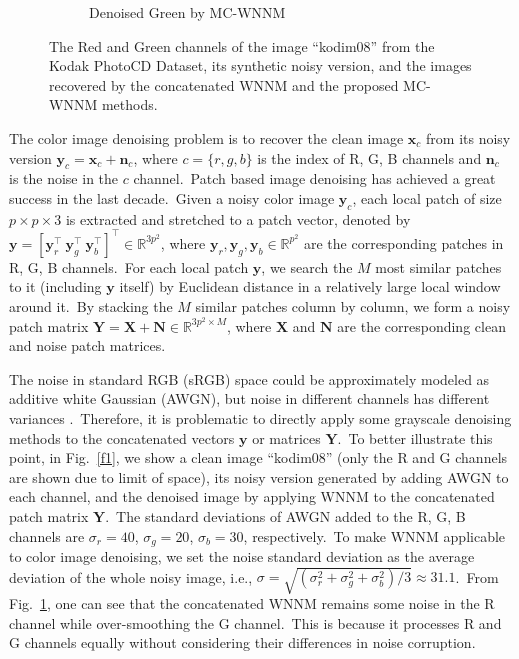 \begin{figure}
\begin{subfigure}[t]{0.24\textwidth}
\caption{Denoised Green by MC-WNNM}
    \end{subfigure}
    \caption{The Red and Green channels of the image ``kodim08'' from the Kodak PhotoCD Dataset, its synthetic noisy version, and the images recovered by the concatenated WNNM and the proposed MC-WNNM methods.}
    \label{fig4-1}
\end{figure}

The color image denoising problem is to recover the clean image $\mathbf{x}_{c}$ from its noisy version $\mathbf{y}_{c}=\mathbf{x}_{c}+\mathbf{n}_{c}$, where $c=\{r, g, b\}$ is the index of R, G, B channels and $\mathbf{n}_{c}$ is the noise in the $c$ channel.\ Patch based image denoising \cite{foe,ksvd,bm3d,lssc,epll,ncsr,mlp,csf,wnnm,pgpd,chen2015learning,dncnn} has achieved a great success in the last decade.\ Given a noisy color image $\mathbf{y}_{c}$, each local patch of size $p\times p \times 3$ is extracted and stretched to a patch vector, denoted by $\mathbf{y}=[\mathbf{y}_{r}^{\top}\ \mathbf{y}_{g}^{\top}\ \mathbf{y}_{b}^{\top}]^{\top}\in\mathbb{R}^{3p^{2}}$, where $\mathbf{y}_{r}, \mathbf{y}_{g}, \mathbf{y}_{b}\in\mathbb{R}^{p^{2}}$ are the corresponding patches in R, G, B channels.\ For each local patch $\mathbf{y}$, we search the $M$ most similar patches to it (including $\mathbf{y}$ itself) by Euclidean distance in a relatively large local window around it.\ By stacking the $M$ similar patches column by column, we form a noisy patch matrix $\mathbf{Y}=\mathbf{X}+\mathbf{N}\in\mathbb{R}^{3p^{2}\times M}$, where $\mathbf{X}$ and $\mathbf{N}$ are the corresponding clean and noise patch matrices.

The noise in standard RGB (sRGB) space could be approximately modeled as additive white Gaussian (AWGN), but noise in different channels has different variances \cite{Liu2008,Leungtip,crosschannel2016}.\ Therefore, it is problematic to directly apply some grayscale denoising methods to the concatenated vectors $\mathbf{y}$ or matrices $\mathbf{Y}$.\ To better illustrate this point, in Fig.\ \ref{f1}, we show a clean image ``kodim08'' (only the R and G channels are shown due to limit of space), its noisy version generated by adding AWGN to each channel, and the denoised image by applying WNNM \cite{wnnmijcv} to the concatenated  patch matrix $\mathbf{Y}$.\ The standard deviations of AWGN added to the R, G, B channels are $\sigma_{r}=40$, $\sigma_{g}=20$, $\sigma_{b}=30$, respectively.\ To make WNNM applicable to color image denoising, we set the noise standard deviation as the average deviation of the whole noisy image, i.e., $\sigma=\sqrt{(\sigma_{r}^{2}+\sigma_{g}^{2}+\sigma_{b}^{2})/3}\approx31.1$.\ From Fig.\ \ref{fig4-1}, one can see that the concatenated WNNM remains some noise in the R channel while over-smoothing the G channel.\ This is because it processes R and G channels equally without considering their differences in noise corruption.

